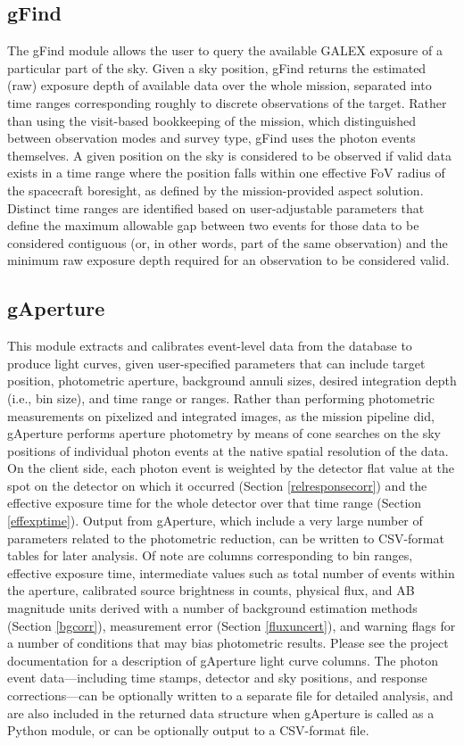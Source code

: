 \documentclass[preprint]{aastex}
\begin{document}
\subsection{gFind}
\label{gfind}
The gFind module allows the user to query the available GALEX exposure of a particular part of the sky. Given a sky position, gFind returns the estimated (raw) exposure depth of available data over the whole mission, separated into time ranges corresponding roughly to discrete observations of the target. Rather than using the visit-based bookkeeping of the mission, which distinguished between observation modes and survey type, gFind uses the photon events themselves. A given position on the sky is considered to be observed if valid data exists in a time range where the position falls within one effective FoV radius of the spacecraft boresight, as defined by the mission-provided aspect solution. Distinct time ranges are identified based on user-adjustable parameters that define the maximum allowable gap between two events for those data to be considered contiguous (or, in other words, part of the same observation) and the minimum raw exposure depth required for an observation to be considered valid.

\subsection{gAperture}
This module extracts and calibrates event-level data from the database to produce light curves, given user-specified parameters that can include target position, photometric aperture, background annuli sizes, desired integration depth (i.e., bin size), and time range or ranges. Rather than performing photometric measurements on pixelized and integrated images, as the mission pipeline did, gAperture performs aperture photometry by means of cone searches on the sky positions of individual photon events at the native spatial resolution of the data. On the client side, each photon event is weighted by the detector flat value at the spot on the detector on which it occurred (Section \ref{relresponsecorr}) and the effective exposure time for the whole detector over that time range (Section \ref{effexptime}). Output from gAperture, which include a very large number of parameters related to the photometric reduction, can be written to CSV-format tables for later analysis. Of note are columns corresponding to bin ranges, effective exposure time, intermediate values such as total number of events within the aperture, calibrated source brightness in counts, physical flux, and AB magnitude units derived with a number of background estimation methods (Section \ref{bgcorr}), measurement error (Section \ref{fluxuncert}), and warning flags for a number of conditions that may bias photometric results. Please see the project documentation for a description of gAperture light curve columns. The photon event data---including time stamps, detector and sky positions, and response corrections---can be optionally written to a separate file for detailed analysis, and are also included in the returned data structure when gAperture is called as a Python module, or can be optionally output to a CSV-format file.
\end{document}
